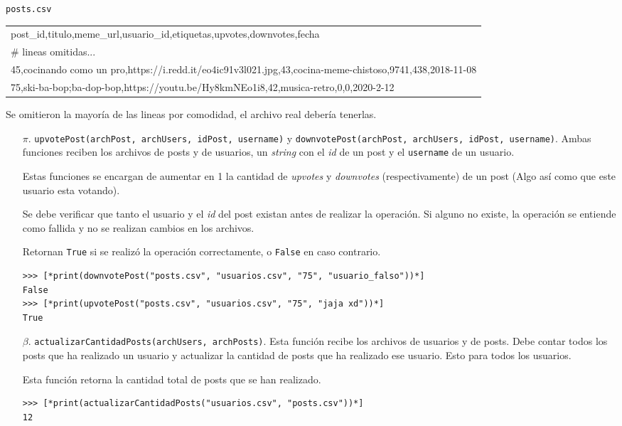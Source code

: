 \begin{center}
    \texttt{posts.csv} \\
	\begin{tabular}{|l|}
		\hline
post\_id,titulo,meme\_url,usuario\_id,etiquetas,upvotes,downvotes,fecha\\
\# lineas omitidas...\\
45,cocinando como un pro,https://i.redd.it/eo4ic91v3l021.jpg,43,cocina-meme-chistoso,9741,438,2018-11-08\\
75,ski-ba-bop;ba-dop-bop,https://youtu.be/Hy8kmNEo1i8,42,musica-retro,0,0,2020-2-12\\
        \hline
	\end{tabular}

Se omitieron la mayoría de las lineas por comodidad, el archivo real debería tenerlas.

\end{center}

\begin{enumerate}

    \item[$\pi$. ] \texttt{upvotePost(archPost, archUsers, idPost, username)} y \texttt{downvotePost(archPost, archUsers, idPost, username)}. Ambas funciones reciben los archivos de posts y de usuarios, un \textit{string} con el \textit{id} de un post y el \texttt{username} de un usuario.
    
    Estas funciones se encargan de aumentar en 1 la cantidad de \textit{upvotes} y \textit{downvotes} (respectivamente) de un post (Algo así como que este usuario esta votando).

    Se debe verificar que tanto el usuario y el \textit{id} del post existan antes de realizar la operación. Si alguno no existe, la operación se entiende como fallida y no se realizan cambios en los archivos.

    Retornan \texttt{True} si se realizó la operación correctamente, o \texttt{False} en caso contrario.

    \begin{lstlisting}[style=consola]
>>> [*print(downvotePost("posts.csv", "usuarios.csv", "75", "usuario_falso"))*]
False
>>> [*print(upvotePost("posts.csv", "usuarios.csv", "75", "jaja xd"))*]
True
    \end{lstlisting}

    \item[$\beta$. ] \texttt{actualizarCantidadPosts(archUsers, archPosts)}. Esta función recibe los archivos de usuarios y de posts. Debe contar todos los posts que ha realizado un usuario y actualizar la cantidad de posts que ha realizado ese usuario. Esto para todos los usuarios.

    Esta función retorna la cantidad total de posts que se han realizado.
    \begin{lstlisting}[style=consola]
>>> [*print(actualizarCantidadPosts("usuarios.csv", "posts.csv"))*]
12
    \end{lstlisting}

\end{enumerate}

